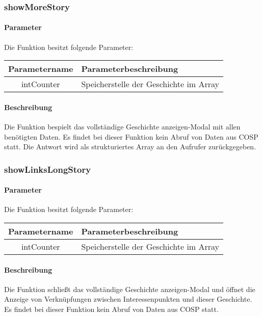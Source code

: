 \subsubsection{showMoreStory}
\paragraph{Parameter} Die Funktion besitzt folgende Parameter:
\begin{table}[H]
	\begin{tabular}{|c|p{11cm}|}
		\hline
		\textbf{Parametername} & \textbf{Parameterbeschreibung} \\ \hline
		intCounter & Speicherstelle der Geschichte im Array \\ \hline
	\end{tabular}
\end{table}
\paragraph{Beschreibung} Die Funktion bespielt das {\glqq vollständige Geschichte anzeigen\grqq}-Modal mit allen benötigten Daten. Es findet bei dieser Funktion kein Abruf von Daten aus {\glqq COSP\grqq} statt. Die Antwort wird als strukturiertes Array an den Aufrufer zurückgegeben.
\subsubsection{showLinksLongStory}
\paragraph{Parameter} Die Funktion besitzt folgende Parameter:
\begin{table}[H]
	\begin{tabular}{|c|p{11cm}|}
		\hline
		\textbf{Parametername} & \textbf{Parameterbeschreibung} \\ \hline
		intCounter & Speicherstelle der Geschichte im Array \\ \hline
	\end{tabular}
\end{table}
\paragraph{Beschreibung} Die Funktion schließt das {\glqq vollständige Geschichte anzeigen\grqq}-Modal und öffnet die Anzeige von Verknüpfungen zwischen Interessenpunkten und dieser Geschichte. Es findet bei dieser Funktion kein Abruf von Daten aus {\glqq COSP\grqq} statt.

